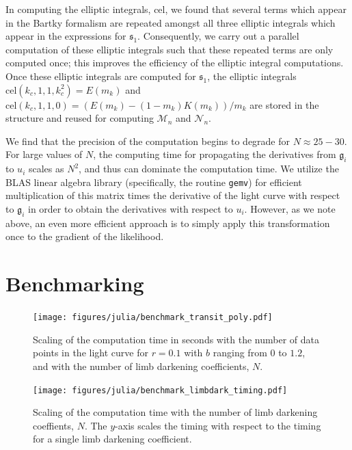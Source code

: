 \documentclass[modern,trackchanges]{aastex63}
\begin{document}
In computing the elliptic integrals, cel, we found that several terms
which appear in the Bartky formalism are repeated amongst all three elliptic
integrals which appear in the expressions for $\mathfrak{s}_1$.  Consequently, we carry
out a parallel computation of these elliptic integrals such that these
repeated terms are only computed once;  this improves the efficiency of
the elliptic integral computations.  Once these elliptic integrals
are computed for $\mathfrak{s}_1$, the elliptic integrals $\mathrm{cel}(k_c,1,1,k_c^2)=E(m_k)$
and $\mathrm{cel}(k_c,1,1,0)=(E(m_k)-(1-m_k)K(m_k))/m_k $ are
stored in the structure and reused for computing $\mathcal{M}_n$
and $\mathcal{N}_n$.

We find that the precision of the computation begins to degrade for
$N \approx 25-30$.  For large values of $N$, the computing time for
propagating the derivatives from $\mathfrak{g}_i$ to $u_i$ scales as $N^2$, and
thus can dominate the computation time.  We utilize the BLAS linear
algebra library (specifically, the routine \texttt{gemv}) for efficient
multiplication of this matrix times the derivative of the light curve with
respect to $\mathfrak{g}_i$ in order to obtain the derivatives with respect to $u_i$.
However, as we note above, an even more efficient approach is to
simply apply this transformation once to the gradient of the likelihood.

\pagebreak

\section{Benchmarking}
\label{sec:benchmark}

\begin{figure}
    \begin{centering}
    \texttt{[image: figures/julia/benchmark\_transit\_poly.pdf]}
    \caption{Scaling of the computation time in seconds with the number of
    data points in the light curve for $r=0.1$ with $b$ ranging from $0$ to $1.2$,
    and with the number of limb darkening coefficients, $N$. 
    \label{fig:ncoeff}}
    \end{centering}
\end{figure}

\begin{figure}
    \begin{centering}
    \texttt{[image: figures/julia/benchmark\_limbdark\_timing.pdf]}
    \caption{Scaling of the computation time with the number of
    limb darkening coeffients, $N$.  The $y$-axis scales the timing with respect
    to the timing for a single limb darkening coefficient. 
    \label{fig:nlimb}}
    \end{centering}
\end{figure}
\end{document}
